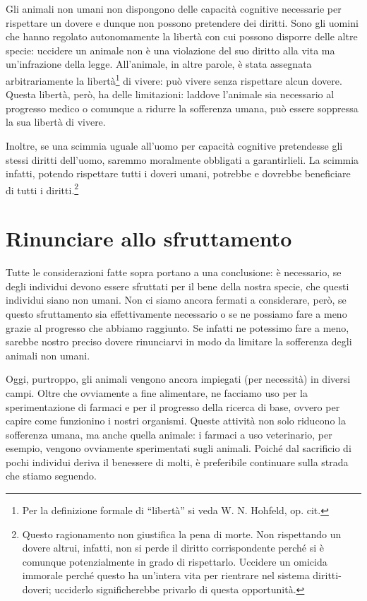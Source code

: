 \documentclass[a4paper,11pt,oneside,article]{memoir}
\begin{document}
Gli animali non umani non dispongono delle capacità cognitive necessarie per
rispettare un dovere e dunque non possono pretendere dei diritti. Sono gli
uomini che hanno regolato autonomamente la libertà con cui possono disporre
delle altre specie: uccidere un animale non è una violazione del suo diritto
alla vita ma un'infrazione della legge. All'animale, in altre parole, è stata
assegnata arbitrariamente la libertà\footnote{Per la definizione formale di
``libertà'' si veda W. N. Hohfeld, op. cit.} di vivere: può vivere senza
rispettare alcun dovere. Questa libertà, però, ha delle limitazioni: laddove
l'animale sia necessario al progresso medico o comunque a ridurre la sofferenza
umana, può essere soppressa la sua libertà di vivere.

Inoltre, se una scimmia uguale all'uomo per capacità cognitive pretendesse gli
stessi diritti dell'uomo, saremmo moralmente obbligati a garantirlieli. La
scimmia infatti, potendo rispettare tutti i doveri umani, potrebbe e dovrebbe
beneficiare di tutti i diritti.\footnote{Questo ragionamento non giustifica la
pena di morte. Non rispettando un dovere altrui, infatti, non si perde il
diritto corrispondente perché si è comunque potenzialmente in grado di
rispettarlo. Uccidere un omicida immorale perché questo ha un'intera vita per
rientrare nel sistema diritti-doveri; ucciderlo significherebbe privarlo di
questa opportunità.}

\chapter{Rinunciare allo sfruttamento}

Tutte le considerazioni fatte sopra portano a una conclusione: è necessario, se
degli individui devono essere sfruttati per il bene della nostra specie, che
questi individui siano non umani. Non ci siamo ancora fermati a considerare,
però, se questo sfruttamento sia effettivamente necessario o se ne possiamo fare
a meno grazie al progresso che abbiamo raggiunto. Se infatti ne potessimo fare a
meno, sarebbe nostro preciso dovere rinunciarvi in modo da limitare la
sofferenza degli animali non umani.

Oggi, purtroppo, gli animali vengono ancora impiegati (per necessità) in diversi
campi. Oltre che ovviamente a fine alimentare, ne facciamo uso per la
sperimentazione di farmaci e per il progresso della ricerca di base, ovvero per
capire come funzionino i nostri organismi. Queste attività non solo riducono la
sofferenza umana, ma anche quella animale: i farmaci a uso veterinario, per
esempio, vengono ovviamente sperimentati sugli animali. Poiché dal sacrificio di
pochi individui deriva il benessere di molti, è preferibile continuare sulla
strada che stiamo seguendo.
\end{document}
